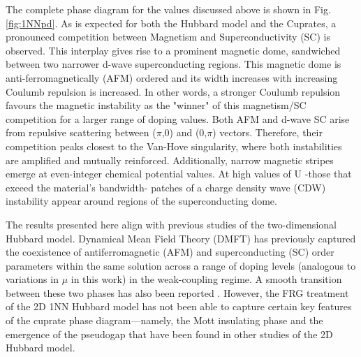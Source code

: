 \documentclass[12pt]{article}
\begin{document}
\medskip
\noindent The complete phase diagram for the values discussed above is shown in Fig.\ref{fig:1NNpd}. As is expected
for both the Hubbard model and the Cuprates\cite{kivelson1998electronic,fradkin2015colloquium,vanhala2018dynamical}, a pronounced competition between Magnetism and 
Superconductivity (SC) is observed. This interplay gives rise to a prominent magnetic dome, sandwiched between two narrower d-wave superconducting regions. This magnetic dome is 
anti-ferromagnetically (AFM) ordered and its width increases with increasing Coulumb repulsion is increased. In other words, a stronger Coulumb repulsion favours the magnetic instability as the "winner" of this magnetism/SC competition 
for a larger range of doping values. Both AFM and d-wave SC arise from repulsive scattering between
($\pi$,0) and (0,$\pi$) vectors. Therefore, their competition peaks closest to the Van-Hove singularity, where both instabilities are amplified and mutually reinforced\cite{furukawa1998truncation,honerkamp2001temperature}.
Additionally, narrow magnetic stripes emerge at even-integer chemical potential values. At high values of U -those that exceed the material's bandwidth- patches of a charge density wave (CDW) instability appear around regions of the superconducting dome.\par

\medskip

\noindent The results presented here align with previous studies of the two-dimensional Hubbard model. Dynamical Mean Field Theory (DMFT) has 
previously captured the coexistence of antiferromagnetic (AFM) and superconducting (SC) order parameters within the same solution across a range of doping levels (analogous to variations in 
$\mu$ in this work) in the weak-coupling regime. A smooth transition between these two phases has also been reported \cite{capone2006competition}. However, the FRG treatment of the 2D 1NN Hubbard model has not been able to capture certain key features
of the cuprate phase diagram—namely, the Mott insulating phase and the emergence of the pseudogap that have been found in other studies of the 2D Hubbard model\cite{katanin2009comparing,otsuki2014superconductivity}.
\end{document}
